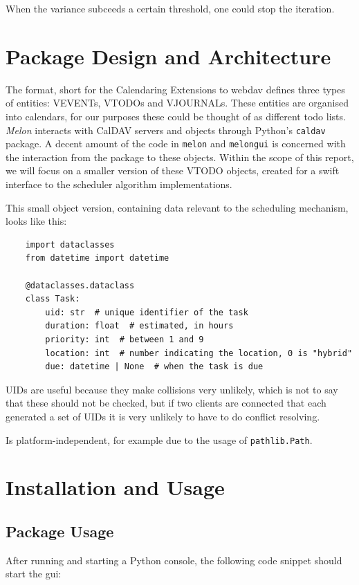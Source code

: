 \documentclass{prettytex/ox/mmsc-special-topic}
\begin{document}
  When the variance subceeds a certain threshold, one could stop the iteration.

  \section{Package Design and Architecture}
  The  format, short for the Calendaring Extensions to \gls{webdav} \parencite{caldav-rfc} defines three types of entities: VEVENTs, VTODOs and VJOURNALs.
  These entities are organised into calendars, for our purposes these could be thought of as different todo lists.
  \textit{Melon} interacts with CalDAV servers and objects through Python's \texttt{caldav} package.
  A decent amount of the code in \texttt{melon} and \texttt{melongui} is concerned with the interaction from the package to these objects.
  Within the scope of this report, we will focus on a smaller version of these VTODO objects, created for a swift interface to the scheduler algorithm implementations.

  This small object version, containing data relevant to the scheduling mechanism, looks like this:
  \begin{verbatim}
    import dataclasses
    from datetime import datetime

    @dataclasses.dataclass
    class Task:
        uid: str  # unique identifier of the task
        duration: float  # estimated, in hours
        priority: int  # between 1 and 9
        location: int  # number indicating the location, 0 is "hybrid"
        due: datetime | None  # when the task is due
  \end{verbatim}

  UIDs are useful because they make collisions very unlikely, which is not to say that these should not be checked, but if two clients are connected that each generated a set of UIDs it is very unlikely to have to do conflict resolving.

  Is platform-independent, for example due to the usage of \texttt{pathlib.Path}.

  \section{Installation and Usage}
  \subsection{Package Usage}
  After running  and starting a Python console, the following code snippet should start the \gls{gui}:
\end{document}
